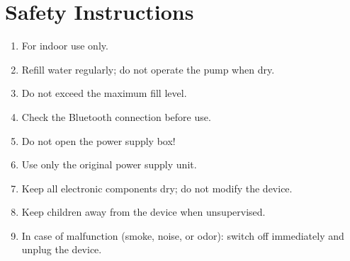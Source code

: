 %
%
%


\section{Safety Instructions}
\begin{enumerate}
	\item For indoor use only.
	\item Refill water regularly; do not operate the pump when dry.
	\item Do not exceed the maximum fill level.
	\item Check the Bluetooth connection before use.
	\item Do not open the power supply box!
	\item Use only the original power supply unit.
	\item Keep all electronic components dry; do not modify the device.
	\item Keep children away from the device when unsupervised.
	\item In case of malfunction (smoke, noise, or odor): switch off immediately and unplug the device.
\end{enumerate}


